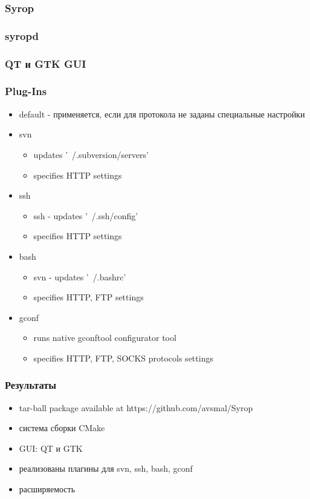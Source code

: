 \documentclass[unicode]{beamer}
\begin{document}
\begin{frame}
\frametitle{Syrop}
\end{frame}

\begin{frame}
\frametitle{syropd}
\end{frame}

\begin{frame}
\frametitle{QT и GTK GUI}
\end{frame}

\begin{frame}

\frametitle{Plug-Ins}

\begin{itemize}

\item default - применяется, если для протокола не заданы специальные настройки

\item svn
\begin{itemize}
\item updates '~/.subversion/servers'
\item specifies HTTP settings
\end{itemize}

\item ssh
\begin{itemize}
\item ssh - updates '~/.ssh/config'
\item specifies HTTP settings
\end{itemize}

\item bash
\begin{itemize}
\item svn - updates '~/.bashrc'
\item specifies HTTP, FTP settings
\end{itemize}

\item gconf
\begin{itemize}
\item runs native gconftool configurator tool
\item specifies HTTP, FTP, SOCKS protocols settings
\end{itemize}

\end{itemize}

\end{frame}

\begin{frame}
\frametitle {Результаты}
\begin{itemize}
\item tar-ball package available at https://github.com/avsmal/Syrop
\item система сборки CMake
\item GUI: QT и GTK
\item реализованы плагины для svn, ssh, bash, gconf
\item расширяемость
\end{itemize}
\end{frame}
\end{document}
